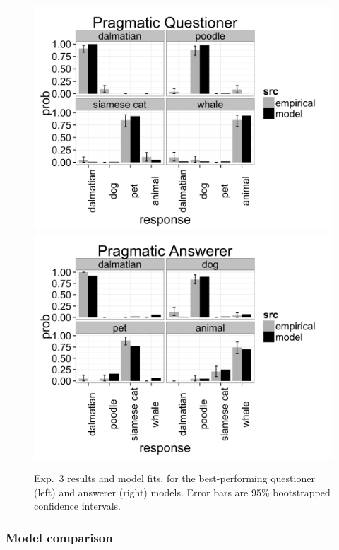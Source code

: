 \documentclass[12pt, floatsintext, jou]{apa6}
\begin{document}
\begin{figure}[t!]
\begin{center}
\includegraphics[scale = .11]{exp3QuestResultsPragmatic.png}
\includegraphics[scale = .11]{exp3AnsResultsPragmatic.png}
\end{center}
\vspace{-.5cm}
\caption{Exp.~3 results and model fits, for the best-performing questioner (left) and answerer (right) models. Error bars are 95\% bootstrapped confidence intervals.}
\vspace{-.1cm}
\label{fig:exp3res}
\end{figure}

\subsubsection{Model comparison}
\end{document}

